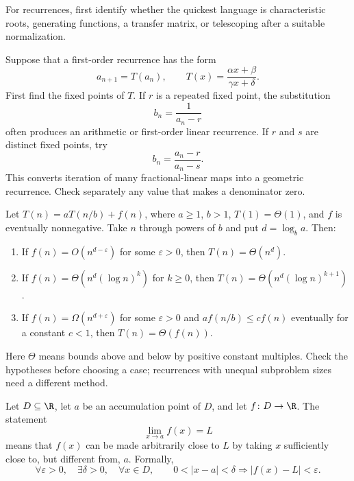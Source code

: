     \begin{strategy}
        For recurrences, first identify whether the quickest language is
        characteristic roots, generating functions, a transfer matrix, or
        telescoping after a suitable normalization.
    \end{strategy}

    \begin{tactic}
        Suppose that a first-order recurrence has the form
        \[
            a_{n+1}=T(a_n),
            \qquad
            T(x)=\frac{\alpha x+\beta}{\gamma x+\delta}.
        \]
        First find the fixed points of $T$. If $r$ is a repeated fixed point,
        the substitution
        \[
            b_n=\frac{1}{a_n-r}
        \]
        often produces an arithmetic or first-order linear recurrence. If
        $r$ and $s$ are distinct fixed points, try
        \[
            b_n=\frac{a_n-r}{a_n-s}.
        \]
        This converts iteration of many fractional-linear maps into a geometric
        recurrence. Check separately any value that makes a denominator zero.
    \end{tactic}

    \begin{theorem}
        Let $T(n)=aT(n/b)+f(n)$, where $a\geq1$, $b>1$,
        $T(1)=\Theta(1)$, and $f$ is eventually nonnegative. Take $n$ through
        powers of $b$ and put $d=\log_b a$. Then:
        \begin{enumerate}
            \item If $f(n)=O(n^{d-\varepsilon})$ for some $\varepsilon>0$,
                  then $T(n)=\Theta(n^d)$.
            \item If $f(n)=\Theta(n^d(\log n)^k)$ for $k\geq0$,
                  then $T(n)=\Theta(n^d(\log n)^{k+1})$.
            \item If $f(n)=\Omega(n^{d+\varepsilon})$ for some $\varepsilon>0$
                  and $af(n/b)\leq cf(n)$ eventually for a constant $c<1$,
                  then $T(n)=\Theta(f(n))$.
        \end{enumerate}
        Here $\Theta$ means bounds above and below by positive constant
        multiples. Check the hypotheses before choosing a case; recurrences
        with unequal subproblem sizes need a different method.
    \end{theorem}

    \begin{definition}
        Let $D\subseteq\R$, let $a$ be an accumulation point of $D$, and let
        $f\colon D\to\R$. The statement
        \[
            \lim\limits_{x\to a}f(x)=L
        \]
        means that $f(x)$ can be made arbitrarily close to $L$ by taking $x$
        sufficiently close to, but different from, $a$. Formally,
        \[
            \forall\varepsilon>0,
            \quad
            \exists\delta>0,
            \quad
            \forall x\in D,
            \qquad
            0<|x-a|<\delta
            \Rightarrow
            |f(x)-L|<\varepsilon.
        \]
    \end{definition}

